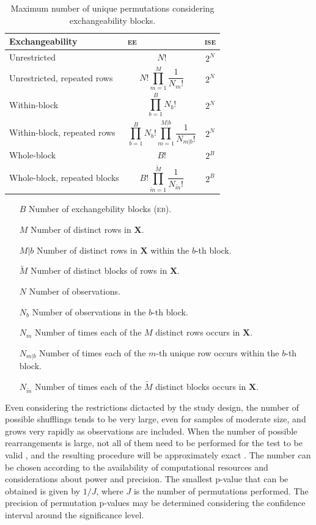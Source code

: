 \begin{table}[p]
\caption[Maximum number of unique permutations.]{Maximum number of unique permutations considering exchangeability blocks.}
\begin{center}
{\small
\begin{tabular}{@{}m{62mm}<{\raggedright}m{44mm}<{\centering}@{}m{15mm}<{\centering}@{}}
\toprule
Exchangeability & \textsc{ee}   & \textsc{ise}\\
\midrule
Unrestricted & \[N!\] & \[2^N\]\\
\midrule
Unrestricted, repeated rows & \[N!\prod_{m=1}^M \frac{1}{N_m!}\] & \[2^N\] \\
\midrule
Within-block & \[\prod_{b=1}^{B} N_{b}!\] & \[2^N\] \\
\midrule
Within-block, repeated rows & \[\prod_{b=1}^{B} N_{b}! \prod_{m=1}^{M|b} \frac{1}{N_{m|b}!}\] & \[2^N\] \\
\midrule
Whole-block  & \[B!\] & \[2^B\]\\
\midrule
Whole-block, repeated blocks  & \[B!\prod_{\tilde{m}=1}^{\tilde{M}} \frac{1}{N_{\tilde{m}}!}\] & \[2^B\]\\
\bottomrule
\end{tabular}}
\end{center}
{\footnotesize
\begin{enumerate}
\item [$B$] Number of exchangebility blocks (\textsc{eb}).
\item [$M$] Number of distinct rows in $\mathbf{X}$.
\item [$M|b$] Number of distinct rows in $\mathbf{X}$ within the $b$-th block.
\item [$\tilde{M}$] Number of distinct blocks of rows in $\mathbf{X}$.
\item [$N$] Number of observations.
\item [$N_b$] Number of observations in the $b$-th block.
\item [$N_m$] Number of times each of the $M$ distinct rows occurs in $\mathbf{X}$.
\item [$N_{m|b}$] Number of times each of the $m$-th unique row occurs within the $b$-th block.
\item [$N_{\tilde{m}}$] Number of times each of the $\tilde{M}$ distinct blocks occurs in $\mathbf{X}$.
\end{enumerate}}
\label{tab:perm:numperm}
\end{table}

Even considering the restrictions dictacted by the study design, the number of possible shufflings tends to be very large, even for samples of moderate size, and grows very rapidly as observations are included. When the number of possible rearrangements is large, not all of them need to be performed for the test to be valid \citep{Dwass1957, Chung1958}, and the resulting procedure will be approximately exact \citep{Edgington1969}. The number can be chosen according to the availability of computational resources and considerations about power and precision. The smallest p-value that can be obtained is given by $1/J$, where $J$ is the number of permutations performed. The precision of permutation p-values may be determined considering the confidence interval around the significance level.

